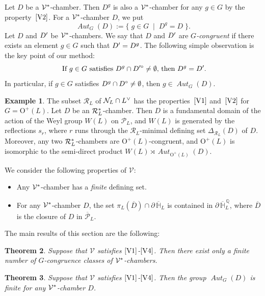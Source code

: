 \documentclass{amsart}
\theoremstyle{plain}
\newtheorem{theorem}{Theorem}[section]
\theoremstyle{definition}
\newtheorem{example}[theorem]{Example}
\theoremstyle{remark}
\numberwithin{equation}{section}
\numberwithin{table}{section}
\numberwithin{figure}{section}
\renewcommand{\H}{\mathord{\mathbb H}}
\newcommand{\Q}{\mathord{\mathbb  Q}}
\newcommand{\NNN}{\mathord{\mathcal N}}
\newcommand{\PPP}{\mathord{\mathcal P}}
\newcommand{\RRR}{\mathord{\mathcal R}}
\newcommand{\VVV}{\mathord{\mathcal V}}
\newcommand{\set}[2]{\{\; {#1} \; \mid \; {#2} \;  \}}
\newcommand{\sprime}{\sp\prime}
\newcommand{\spcirc}{\sp{\mathord{\circ}}}
\newcommand{\dual}{\sp{\vee}}
\newcommand{\semidirectproduct}{\rtimes}
\newcommand{\bdr}{\partial\,}
\newcommand{\OG}{\mathord{\mathrm {O}}}
\newcommand{\aut}{\operatorname{\mathit {Aut}}\nolimits}
\newcommand{\autG}{\aut_G}
\newcommand{\Roots}{\RRR}
\newcommand{\sphyp}{\sp*}
\newcommand{\clPPP}{\overline{\PPP}}
\newcommand{\clH}{\overline{\H}}
\newcommand{\clD}{\overline{D}}
\newcommand{\bdrclH}{\bdr\clH}
\newcommand{\bdrclHQ}{\bdr\clH^{\,\Q}}
\newcommand{\propVone}{\mathord{\rm [V1]}}
\newcommand{\propVtwo}{\mathord{\rm [V2]}}
\newcommand{\propVthree}{\mathord{\rm [V3]}}
\newcommand{\propVfour}{\mathord{\rm [V4]}}
\begin{document}
%
%
%
Let $D$ be 
 a $\VVV\sphyp$-chamber.
 Then $D^g$ is also a $\VVV\sphyp$-chamber for any $g\in G$ 
 by the property~$\propVtwo$.
 For a  $\VVV\sphyp$-chamber $D$,
we put
$$
\autG(D):=\set{g\in G}{D^g=D}.
$$
Let $D$ and $D\sprime$ be $\VVV\sphyp$-chambers.
We say that  $D$ and $D\sprime$ are \emph{$G$-congruent}
if there exists an element $g\in G$ such that $D\sprime=D^g$.
The following simple observation is the key point of our method:
%
\begin{equation}\label{eq:intpt}
\textrm{
If $g\in G$ satisfies $D^g\cap D\sp{\prime\circ}\ne\emptyset$, 
then $D^g=D\sprime$.}
\end{equation}
In particular, if $g\in G$ satisfies $D^g\cap D\spcirc\ne\emptyset$, then $g\in \autG(D)$.
%
%
\begin{example}\label{example:W}
The subset $\Roots_L$ of $\NNN_L\cap L\dual$ has the properties~$\propVone$ and~$\propVtwo$
for $G=\OG^+(L)$.
Let $D$ be an $\Roots_L\sphyp$-chamber.
Then $D$ is a fundamental domain of the action of the Weyl group $W(L)$ on $\PPP_L$, %
and  $W(L)$ 
is generated by the reflections $s_r$, 
where $r$ runs through the $\Roots_L$-minimal defining set $\Delta_{\Roots_L}(D)$
of $D$.
Moreover,  any two $\Roots_L\sphyp$-chambers are $\OG^+(L)$-congruent,
and $\OG^+(L)$ is isomorphic to the semi-direct product
$W(L)\semidirectproduct \aut_{\OG^+(L)}(D)$.
\end{example}
%
We consider the following properties of $\VVV$:
%
\begin{itemize}
\item[$\propVthree$] 
Any $\VVV\sphyp$-chamber  has a \emph{finite} defining set.
\item[$\propVfour$] For any $\VVV\sphyp$-chamber $D$, 
the set  $\pi_L(\clD )\cap \bdrclH_L$ is contained in $\bdrclHQ_L$,
where  $\clD $ is the closure  of $D$ in $\clPPP_L$.
\end{itemize}
%
The main results of this section are the following:
%
\begin{theorem}\label{thm:finiteGequiv}
Suppose that $\VVV$ satisfies $\propVone$-$\propVfour$.
Then there exist only a finite number of $G$-congruence classes of $\VVV\sphyp$-chambers.
\end{theorem}
%
%
\begin{theorem}\label{thm:finiteautG}
Suppose that $\VVV$ satisfies $\propVone$-$\propVfour$.
Then the  group $\aut_G(D)$ is finite for any  $\VVV\sphyp$-chamber $D$.
\end{theorem}
%
%
\end{document}
